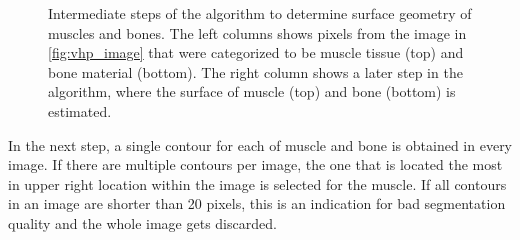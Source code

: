 \begin{figure}
  \caption{Intermediate steps of the algorithm to determine surface geometry of muscles and bones. The left columns shows pixels from the image in \cref{fig:vhp_image} that were categorized to be muscle tissue (top) and bone material (bottom). The right column shows a later step in the algorithm, where the surface of muscle (top) and bone (bottom) is estimated.}%
  \label{fig:extraction}%
\end{figure}%

In the next step, a single contour for each of muscle and bone is obtained in every image. If there are multiple contours per image, the one that is located the most in upper right location within the image is selected for the muscle. If all contours in an image are shorter than 20 pixels, this is an indication for bad segmentation quality and the whole image gets discarded.

